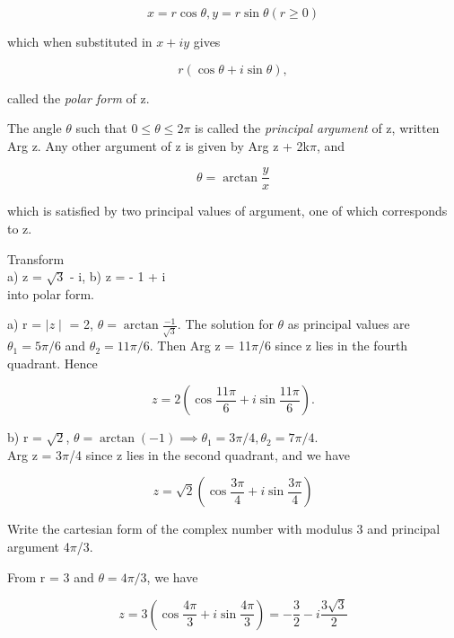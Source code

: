 \documentclass[11pt]{amsbook}
\begin{document}
		\[
			x = r \cos \theta, y = r \sin \theta (r \geq 0)
		\]

which when substituted in $x + iy$ gives
		
		\[
			r(\cos \theta + i \sin \theta),
		\]

called the \textit{polar form} of z.
\par The angle $\theta$ such that $0 \leq \theta \leq 2\pi$ is called the \textit{principal argument} of z, written Arg z. Any other argument of z is given by Arg  z + 2k$\pi$, and
		
		\[
			\theta = \arctan{\frac{y}{x}}
		\]

which is satisfied by two principal values of argument, one of which corresponds to z.

\begin{exmp} {Transform \\a) z = $\sqrt{3}$ - i, b) z = - 1 + i \\ into polar form.}
\end{exmp}

\begin{hSolution}

a) r = $\mid z\mid$ = 2, $\theta = \arctan{\frac{-1}{\sqrt{3}}}$. The solution for $\theta$ as principal values are $\theta_1 = 5\pi / 6$ and $\theta_2 = 11\pi / 6$. Then Arg z = 11$\pi$/6 since z lies in the fourth quadrant. Hence
		
		\[
			z = 2(\cos{\frac{11\pi}{6}} + i \sin{\frac{11\pi}{6}}).
		\]

b) r = $\sqrt{2}$, $\theta = \arctan{(-1)} \implies \theta_1 = 3\pi/4, \theta_2 = 7\pi/4$. \\
Arg z = 3$\pi$/4 since z lies in the second quadrant, and we have
		
		\[
		 	z = \sqrt{2}(\cos{\frac{3\pi}{4}} + i\sin{\frac{3\pi}{4}})
		\] 

\end{hSolution}

\begin{exmp}{Write the cartesian form of the complex number with modulus 3 and principal argument 4$\pi$/3.}
\end{exmp}

\begin{hSolution}

From r = 3 and $\theta = 4\pi/3$, we have
		
		\[
			z = 3(\cos{\frac{4\pi}{3}} + i \sin{\frac{4\pi}{3}}) = - \frac{3}{2} - i \frac{3\sqrt{3}}{2}
		\]

\end{hSolution}
\end{document}
